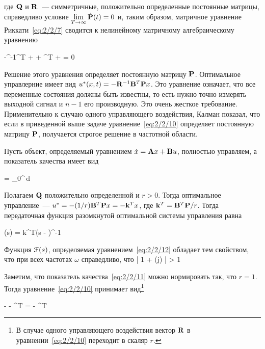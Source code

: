 где $\mathbf{Q}$ и $\mathbf{R}$~--- симметричные, положительно определенные постоянные матрицы, справедливо условие $\lim\limits_{T \to \infty}\dot{\mathbf{P}}(t) = 0$ и, таким образом, матричное уравнение Риккати~\ref{eq:2/2/7} сводится к нелинейному матричному алгебраическому уравнению

    -^{-1}^T +  + ^T +  = 0 
\eeq

Решение этого уравнения определяет постоянную матрицу $\mathbf{P}$. Оптимальное управлерние имеет вид $u^{*}(x, t) = -\mathbf{R}^{-1}\mathbf{B}^T\mathbf{P} x$. Это уравнение означает, что все переменные состояния должны быть известны, то есть нужно точно измерять выходной сигнал и $n-1$ его производную. Это очень жесткое требование. Применительно к случаю одного управляющего воздействия, Калман\cite{KALMAN2} показал, что если в приведенной выше задаче уравнение~\ref{eq:2/2/10} определяет постоянную матрицу $\mathbf{P}$, получается строгое решение в частотной области.

\br

Пусть объект, определяемый уравнением $\dot{x} = \mathbf{A}x + \mathbf{B} u$, полностью управляем, а показатель качества имеет вид

    \funcF =  \int\limits_0^\infty {}\,d\tau {}
\eeq

Полагаем $\mathbf{Q}$ положительно определенной и $r > 0$. Тогда оптимальное управление~--- $u^{*} = -(1/r) \mathbf{B}^T\mathbf{P} x = -\mathbf{k}^Tx$, где $\mathbf{k}^T = \mathbf{B}^T\mathbf{P} / r$. Тогда передаточная функция разомкнутой оптимальной системы управления равна\cite{XU}

    \funcT(s) = k^T(s - )^{-1} 
\eeq

    Функция $\mathcal{F}(s)$, определяемая уравнением~\ref{eq:2/2/12} обладает тем свойством, что при всех частотах $\omega$ справедливо, что
    	\bigl| 1 + \funcT(j\omega) \bigr| > 1 
	\eeq
\eteo


Заметим, что показатель качества~\ref{eq:2/2/11} можно нормировать так, что $r=1$. Тогда уравнение~\ref{eq:2/2/10} принимает вид\footnote{ В случае одного управляющего воздействия вектор $\mathbf{R}$ в уравнении~\ref{eq:2/2/10} переходит в скаляр $r$. }

    -  - ^T =  -  ^T 
\eeq

